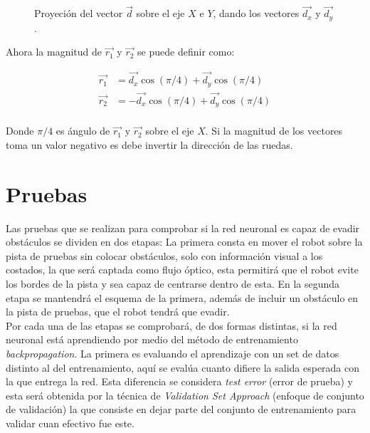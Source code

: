 \documentclass{iccmemoria}
\begin{document}
\begin{figure}[H]
  \centering
  \begin{large}
  
  \end{large}
  \caption{Proyeción del vector $\vec{d}$ sobre el eje $X$ e $Y$, dando los vectores $\vec{d_{x}}$ y $\vec{d_{y}}$ .}
  \label{fig:vec_proyection}
\end{figure}

Ahora la magnitud de $\vec{r_{1}}$ y $\vec{r_{2}}$ se puede definir como:

\begin{equation}
	\begin{split}
	\vec{r_{1}} & = \vec{d_{x}}\cos(\pi/4)  + \vec{d_{y}}\cos(\pi/4)\\
	\vec{r_{2}} & = -\vec{d_{x}}\cos(\pi/4) + \vec{d_{y}}\cos(\pi/4)\\
	\end{split}
\end{equation}

Donde $\pi/4$ es ángulo de $\vec{r_{1}}$ y $\vec{r_{2}}$ sobre el eje $X$. Si la magnitud de los vectores toma un valor negativo es debe invertir la dirección de las ruedas.\\

\chapter{Pruebas}

Las pruebas que se realizan para comprobar si la red neuronal es capaz de evadir obstáculos se dividen en dos etapas: La primera consta en mover el robot sobre la pista de pruebas sin colocar obstáculos, solo con información visual a los costados, la que será captada como flujo óptico, esta permitirá que el robot evite los bordes de la pista y sea capaz de centrarse dentro de esta. En la segunda etapa se mantendrá el esquema de la primera, además de incluir un obstáculo en la pista de pruebas, que el robot tendrá que evadir.\\

Por cada una de las etapas se comprobará, de dos formas distintas, si la red neuronal está aprendiendo por medio del método de entrenamiento \emph{backpropagation}. La primera es evaluando el aprendizaje con un set de datos distinto al del entrenamiento, aquí se evalúa cuanto difiere la salida esperada con la que entrega la red. Esta diferencia se considera \emph{test error} (error de prueba) y esta será obtenida por la técnica de \emph{Validation Set Approach} (enfoque de conjunto de validación) la que consiste en dejar parte del conjunto de entrenamiento para validar cuan efectivo fue este.\\
\end{document}
